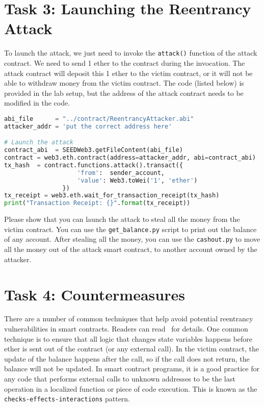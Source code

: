  


\section{Task 3: Launching the Reentrancy Attack} 

To launch the attack, we just need to invoke the \texttt{attack()}
function of the attack contract. We need to send 1 ether to the 
contract during the invocation. The attack contract will deposit
this 1 ether to the victim contract, or it will not be able to 
withdraw money from the victim contract. 
The code (listed below) is provided in the lab setup, but 
the address of the attack contract needs to be modified in the code. 

\begin{lstlisting}[language=Python, 
   caption = The code to launch the attack (\texttt{deploy\_attack\_contract.py})]
abi_file      = "../contract/ReentrancyAttacker.abi"
attacker_addr = 'put the correct address here'  

# Launch the attack
contract_abi  = SEEDWeb3.getFileContent(abi_file)
contract = web3.eth.contract(address=attacker_addr, abi=contract_abi)
tx_hash  = contract.functions.attack().transact({
                    'from':  sender_account,
                    'value': Web3.toWei('1', 'ether')
                })
tx_receipt = web3.eth.wait_for_transaction_receipt(tx_hash)
print("Transaction Receipt: {}".format(tx_receipt))
\end{lstlisting}
 
Please show that you can launch the attack to steal all the 
money from the victim contract. You can use the 
\texttt{get\_balance.py} script to print out the 
balance of any account. After stealing all the money, you can
use the \texttt{cashout.py} to move all the money out of the
attack smart contract, to another account owned by the 
attacker. 


\section{Task 4: Countermeasures} 


There are a number of common techniques that help avoid potential 
reentrancy vulnerabilities in smart contracts. 
Readers can read~\cite{MasteringEthereum} for details. 
One common technique is to 
ensure that all logic that changes state variables happens before
ether is sent out of the contract (or any external call). In the 
victim contract, the update of the balance happens after the call, 
so if the call does not return, the balance will not be updated. 
In smart contract programs, 
it is a good practice for any code that performs external calls to unknown addresses to be the
last operation in a localized function or piece of code execution. This is known as the
\texttt{checks-effects-interactions} pattern.

